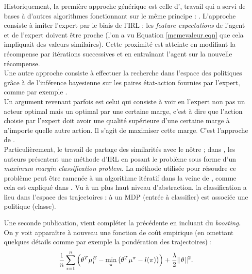 \documentclass[publibook-draft]{CAp2012}
\begin{document}
{Historiquement, la première approche générique est celle d'\cite{abbeel2004apprenticeship}, travail qui a servi de bases à d'autres algorithmes fonctionnant sur le même principe : \citep{syed2008apprenticeship,syed2008game, ziebart2008maximum}. L'approche consiste à imiter l'expert par le biais de l'IRL ; les {\it feature expectations} de l'agent et de l'expert doivent être proche (l'on a vu Equation \ref{memevaleur.eqn} que cela impliquait des valeurs similaires). Cette proximité est atteinte en modifiant la récompense par itérations successives et en entraînant l'agent sur la nouvelle récompense.\\

Une autre approche consiste à effectuer la recherche dans l'espace des politiques grâce à de l'inférence bayesienne sur les paires état-action fournies par l'expert, comme par exemple \cite{ramachandran2007bayesian}.\\

Un argument revenant parfois est celui qui consiste à voir en l'expert non pas un acteur optimal mais un optimal par une certaine marge, c'est à dire que l'action choisie par l'expert doit avoir une qualité supérieure d'une certaine marge à n'importe quelle autre action. Il s'agit de maximiser cette marge. C'est l'approche de \citet{ratliff2006maximum,ratliff2007imitation, ratliff2007boosting, kolter2008hierarchical}.\\

Particulièrement, le travail de \citet{ratliff2006maximum} partage des similarités avec le nôtre ; dans \citep{ratliff2006maximum}, les auteurs présentent une méthode d'IRL en posant le problème sous forme d'un \emph{maximum margin classification problem}. La méthode utilisée pour résoudre ce problème peut être ramenée à un algorithme itératif dans la veine de \cite{abbeel2004apprenticeship}, comme cela est expliqué dans \cite{neu2009training}. Vu à un plus haut niveau d'abstraction, la classification a lieu dans l'espace des trajectoires : à un MDP (entrée à classifier) est associée une politique (classe).

   Une seconde publication, \citep{ratliff2007boosting} vient compléter la précédente en incluant du \emph{boosting}. On y voit apparaître à nouveau une fonction de coût empirique (en omettant quelques détails comme par exemple la pondération des trajectoires) :
   \begin{equation}
   \label{dix.eqn}%
   {1\over n}\sum\limits_{i=1}^n \left(\theta^T\mu^E_i - \min_\pi\left(\theta^T \mu^\pi - l(\pi)\right)\right) + {\lambda \over 2} ||\theta||^2.
   \end{equation}

}
\end{document}
